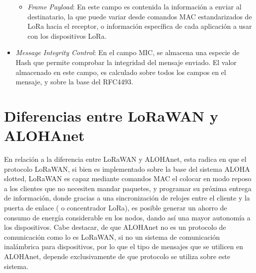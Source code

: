 \begin{justify}
\begin{itemize}
\begin{itemize}
\item \textit{Frame Payload}: En este campo es contenida la información a enviar al destinatario, la que puede variar desde comandos MAC estandarizados de LoRa hacia el receptor, o información específica de cada aplicación a usar con los dispositivos LoRa.
\end{itemize}
\item \textit{Message Integrity Control}: En el campo MIC, se almacena una especie de Hash que permite comprobar la integridad del mensaje enviado. El valor almacenado en este campo, es calculado sobre todos los campos en el mensaje, y sobre la base del RFC4493.
\end{itemize}
\section{Diferencias entre LoRaWAN y ALOHAnet}
En relación a la diferencia entre LoRaWAN y ALOHAnet, esta radica en que el protocolo LoRaWAN, si bien es implementado sobre la base del sistema ALOHA slotted, LoRaWAN es capaz mediante comandos MAC el colocar en modo reposo a los clientes que no necesiten mandar paquetes, y programar su próxima entrega de información, donde gracias a una sincronización de relojes entre el cliente y la puerta de enlace ( o concentrador LoRa), es posible generar un ahorro de consumo de energía considerable en los nodos, dando así una mayor autonomía a los dispositivos. Cabe destacar, de que ALOHAnet no es un protocolo de comunicación como lo es LoRaWAN, si no un sistema de comunicación inalámbrica para dispositivos, por lo que el tipo de mensajes que se utilicen en ALOHAnet, depende exclusivamente de que protocolo se utiliza sobre este sistema.\\

\end{justify}
